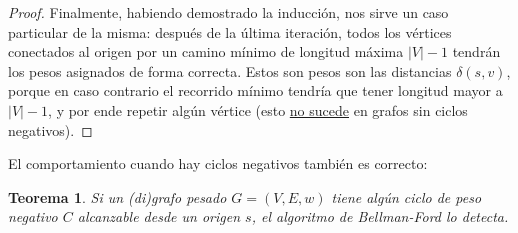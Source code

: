 \documentclass[a4paper]{report}
\newtheorem*{theorem*}{Teorema}
\begin{document}
\begin{proof}
    Finalmente, habiendo demostrado la inducción, nos sirve un caso particular de la misma: después de la última iteración, todos los vértices conectados al origen por un camino mínimo de longitud máxima $|V| - 1$ tendrán los pesos asignados de forma correcta. Estos son pesos son las distancias $\delta(s, v)$, porque en caso contrario el recorrido mínimo tendría que tener longitud mayor a $|V| - 1$, y por ende repetir algún vértice (esto \hyperref[teorema-ciclos-negativos]{no sucede} en grafos sin ciclos negativos).

\end{proof}

El comportamiento cuando hay ciclos negativos también es correcto:

\begin{theorem*}
    Si un (di)grafo pesado $G = (V, E, w)$ tiene algún ciclo de peso negativo $C$ alcanzable desde un origen $s$, el algoritmo de Bellman-Ford lo detecta.
\end{theorem*}
\end{document}
